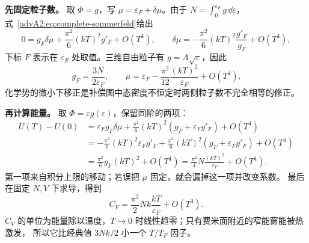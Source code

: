 \textbf{先固定粒子数。} 取 $\Phi=g$，写 $\mu=\varepsilon_F+\delta\mu$。由于
$N=\int_0^{\varepsilon_F}g\,\dd\varepsilon$，式~\eqref{advA2:eq:complete-sommerfeld}给出
\[
 0=g_F\delta\mu+\frac{\pi^2}{6}(kT)^2g'_F+O(T^4),
 \qquad
 \delta\mu=-\frac{\pi^2}{6}(kT)^2\frac{g'_F}{g_F}+O(T^4),
\]
下标 $F$ 表示在 $\varepsilon_F$ 处取值。三维自由粒子有 $g=A\sqrt\varepsilon$，因此
\[
 g_F=\frac{3N}{2\varepsilon_F},\qquad
 \mu=\varepsilon_F-\frac{\pi^2}{12}\frac{(kT)^2}{\varepsilon_F}+O(T^4).
\]
化学势的微小下移正是补偿图中态密度不恒定时两侧粒子数不完全相等的修正。

\textbf{再计算能量。} 取 $\Phi=\varepsilon g(\varepsilon)$，保留同阶的两项：
\begin{align*}
 U(T)-U(0)
 &=\varepsilon_Fg_F\delta\mu
   +\frac{\pi^2}{6}(kT)^2(g_F+\varepsilon_Fg'_F)+O(T^4)\\
 &=-\frac{\pi^2}{6}(kT)^2\varepsilon_Fg'_F
   +\frac{\pi^2}{6}(kT)^2(g_F+\varepsilon_Fg'_F)+O(T^4)\\
 &=\frac{\pi^2}{6}g_F(kT)^2+O(T^4)
  =\frac{\pi^2}{4}N\frac{(kT)^2}{\varepsilon_F}+O(T^4).
\end{align*}
第一项来自积分上限的移动；若误把 $\mu$ 固定，就会漏掉这一项并改变系数。
最后在固定 $N,V$ 下求导，得到
\[
 \boxed{C_V=\frac{\pi^2}{2}Nk\frac{kT}{\varepsilon_F}+O(T^3)}.
\]
$C_V$ 的单位为能量除以温度，$T\to0$ 时线性趋零；只有费米面附近的窄能窗能被热激发，
所以它比经典值 $3Nk/2$ 小一个 $T/T_F$ 因子。
